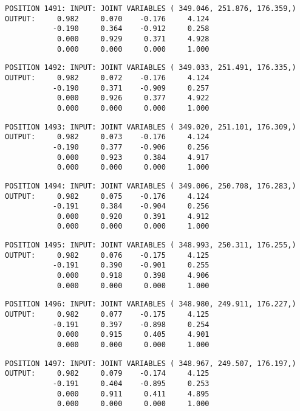 \begin{verbatim}
POSITION 1491: INPUT: JOINT VARIABLES ( 349.046, 251.876, 176.359,)
OUTPUT:     0.982     0.070    -0.176     4.124
           -0.190     0.364    -0.912     0.258
            0.000     0.929     0.371     4.928
            0.000     0.000     0.000     1.000
\end{verbatim} \pagebreak[1]\begin{verbatim}
POSITION 1492: INPUT: JOINT VARIABLES ( 349.033, 251.491, 176.335,)
OUTPUT:     0.982     0.072    -0.176     4.124
           -0.190     0.371    -0.909     0.257
            0.000     0.926     0.377     4.922
            0.000     0.000     0.000     1.000
\end{verbatim} \pagebreak[1]\begin{verbatim}
POSITION 1493: INPUT: JOINT VARIABLES ( 349.020, 251.101, 176.309,)
OUTPUT:     0.982     0.073    -0.176     4.124
           -0.190     0.377    -0.906     0.256
            0.000     0.923     0.384     4.917
            0.000     0.000     0.000     1.000
\end{verbatim} \pagebreak[1]\begin{verbatim}
POSITION 1494: INPUT: JOINT VARIABLES ( 349.006, 250.708, 176.283,)
OUTPUT:     0.982     0.075    -0.176     4.124
           -0.191     0.384    -0.904     0.256
            0.000     0.920     0.391     4.912
            0.000     0.000     0.000     1.000
\end{verbatim} \pagebreak[1]\begin{verbatim}
POSITION 1495: INPUT: JOINT VARIABLES ( 348.993, 250.311, 176.255,)
OUTPUT:     0.982     0.076    -0.175     4.125
           -0.191     0.390    -0.901     0.255
            0.000     0.918     0.398     4.906
            0.000     0.000     0.000     1.000
\end{verbatim} \pagebreak[1]\begin{verbatim}
POSITION 1496: INPUT: JOINT VARIABLES ( 348.980, 249.911, 176.227,)
OUTPUT:     0.982     0.077    -0.175     4.125
           -0.191     0.397    -0.898     0.254
            0.000     0.915     0.405     4.901
            0.000     0.000     0.000     1.000
\end{verbatim} \pagebreak[1]\begin{verbatim}
POSITION 1497: INPUT: JOINT VARIABLES ( 348.967, 249.507, 176.197,)
OUTPUT:     0.982     0.079    -0.174     4.125
           -0.191     0.404    -0.895     0.253
            0.000     0.911     0.411     4.895
            0.000     0.000     0.000     1.000
\end{verbatim} \pagebreak[1]\begin{verbatim}

\end{verbatim}
